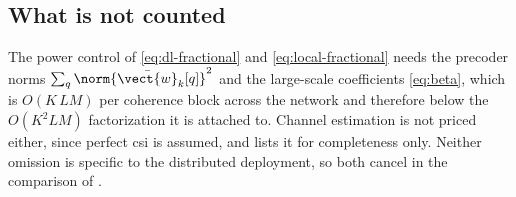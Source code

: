 \subsection{What is not counted}
The power control of \eqref{eq:dl-fractional} and \eqref{eq:local-fractional}
needs the precoder norms $\sum_{q}\norm{\bar{\vect{w}}_{k}[q]}^{2}$ and the
large-scale coefficients \eqref{eq:beta}, which is $O(K\,LM)$ per coherence block
across the network and therefore below the $O(K^{2}LM)$ factorization it is
attached to. Channel estimation is not priced either, since perfect \gls{csi} is
assumed, and  lists it for completeness only. Neither omission
is specific to the distributed deployment, so both cancel in the comparison of
.
